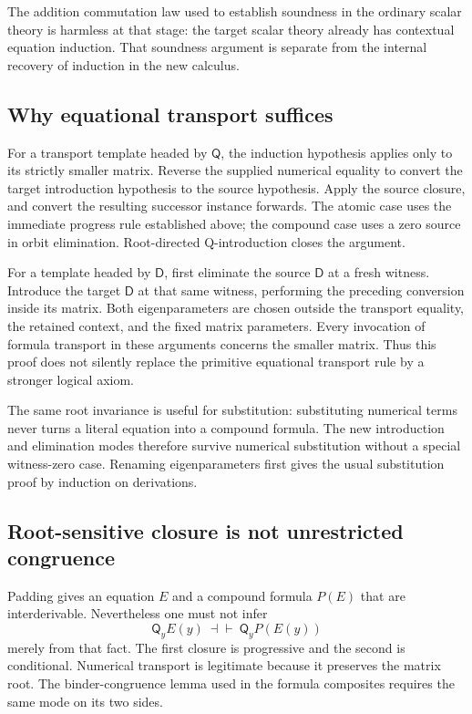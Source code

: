 The addition commutation law used to establish soundness in the ordinary
scalar theory is harmless at that stage: the target scalar theory already
has contextual equation induction.  That soundness argument is separate
from the internal recovery of induction in the new calculus.

\subsection{Why equational transport suffices}

For a transport template headed by $\mathsf Q$, the induction hypothesis
applies only to its strictly smaller matrix.  Reverse the supplied
numerical equality to convert the target introduction hypothesis to the
source hypothesis.  Apply the source closure, and convert the resulting
successor instance forwards.  The atomic case uses the immediate progress
rule established above; the compound case uses a zero source in orbit
elimination.  Root-directed Q-introduction closes the argument.

For a template headed by $\mathsf D$, first eliminate the source
$\mathsf D$ at a fresh witness.  Introduce the target $\mathsf D$ at that
same witness, performing the preceding conversion inside its matrix.
Both eigenparameters are chosen outside the transport equality, the
retained context, and the fixed matrix parameters.  Every invocation of
formula transport in these arguments concerns the smaller matrix.
Thus this proof does not silently replace the primitive equational
transport rule by a stronger logical axiom.

The same root invariance is useful for substitution: substituting numerical
terms never turns a literal equation into a compound formula.  The new
introduction and elimination modes therefore survive numerical substitution
without a special witness-zero case.  Renaming eigenparameters first gives
the usual substitution proof by induction on derivations.

\subsection{Root-sensitive closure is not unrestricted congruence}

Padding gives an equation $E$ and a compound formula $P(E)$ that are
interderivable.  Nevertheless one must not infer
\[
               \mathsf Q_yE(y)\ \dashv\vdash\ 
               \mathsf Q_yP(E(y))
\]
merely from that fact.  The first closure is progressive and the second
is conditional.  Numerical transport is legitimate because it preserves
the matrix root.  The binder-congruence lemma used in the formula
composites requires the same mode on its two sides.

